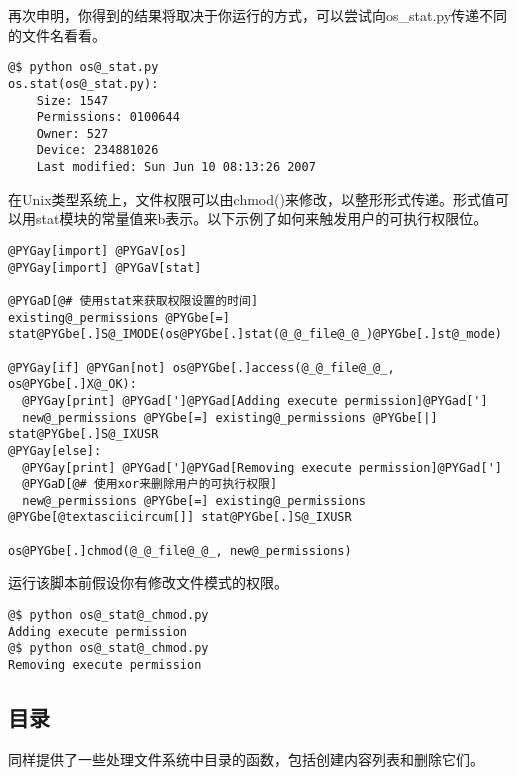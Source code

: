 \documentclass[a4paper,10pt,english]{manual}
\begin{document}
再次申明，你得到的结果将取决于你运行的方式，可以尝试向os\_stat.py传递不同的文件名看看。

\begin{Verbatim}[commandchars=@\[\]]
@$ python os@_stat.py
os.stat(os@_stat.py):
    Size: 1547
    Permissions: 0100644
    Owner: 527
    Device: 234881026
    Last modified: Sun Jun 10 08:13:26 2007
\end{Verbatim}

在Unix类型系统上，文件权限可以由chmod()来修改，以整形形式传递。形式值可以用stat模块的常量值来b表示。以下示例了如何来触发用户的可执行权限位。

\begin{Verbatim}[commandchars=@\[\]]
@PYGay[import] @PYGaV[os]
@PYGay[import] @PYGaV[stat]

@PYGaD[@# 使用stat来获取权限设置的时间]
existing@_permissions @PYGbe[=] stat@PYGbe[.]S@_IMODE(os@PYGbe[.]stat(@_@_file@_@_)@PYGbe[.]st@_mode)

@PYGay[if] @PYGan[not] os@PYGbe[.]access(@_@_file@_@_, os@PYGbe[.]X@_OK):
  @PYGay[print] @PYGad[']@PYGad[Adding execute permission]@PYGad[']
  new@_permissions @PYGbe[=] existing@_permissions @PYGbe[|] stat@PYGbe[.]S@_IXUSR
@PYGay[else]:
  @PYGay[print] @PYGad[']@PYGad[Removing execute permission]@PYGad[']
  @PYGaD[@# 使用xor来删除用户的可执行权限]
  new@_permissions @PYGbe[=] existing@_permissions @PYGbe[@textasciicircum[]] stat@PYGbe[.]S@_IXUSR

os@PYGbe[.]chmod(@_@_file@_@_, new@_permissions)
\end{Verbatim}

运行该脚本前假设你有修改文件模式的权限。

\begin{Verbatim}[commandchars=@\[\]]
@$ python os@_stat@_chmod.py
Adding execute permission
@$ python os@_stat@_chmod.py
Removing execute permission
\end{Verbatim}


\subsection{目录}

同样提供了一些处理文件系统中目录的函数，包括创建内容列表和删除它们。
\end{document}
